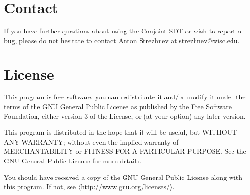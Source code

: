 \documentclass[12pt]{article}
\begin{document}
\section{Contact}

If you have further questions about using the Conjoint SDT or wish to report a bug, please do not hesitate to contact Anton Strezhnev at \href{mailto:strezhnev@wisc.edu}{strezhnev@wisc.edu}.

\section{License}

This program is free software: you can redistribute it and/or modify it under the terms of the GNU General Public License as published by the Free Software Foundation, either version 3 of the License, or (at your option) any later version.

This program is distributed in the hope that it will be useful, but WITHOUT ANY WARRANTY; without even the implied warranty of MERCHANTABILITY or FITNESS FOR A PARTICULAR PURPOSE. See the GNU General Public License for more details.

You should have received a copy of the GNU General Public License along with this program.  If not, see $\langle$\href{http://www.gnu.org/licenses/}{http://www.gnu.org/licenses/}$\rangle$.


\clearpage


\end{document}
